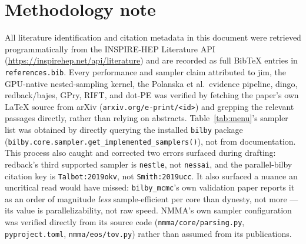 \documentclass[11pt]{article}
\newcommand{\code}[1]{\texttt{#1}}
\begin{document}
\section*{Methodology note}
All literature identification and citation metadata in this document were retrieved
programmatically from the INSPIRE-HEP Literature API
(\url{https://inspirehep.net/api/literature}) and are recorded as full BibTeX entries in
\code{references.bib}. Every performance and sampler claim attributed to jim, the GPU-native
nested-sampling kernel, the Polanska et al.\ evidence pipeline, dingo, redback/bajes, GPry,
RIFT, and dot-PE was verified by fetching the paper's own \LaTeX{} source from arXiv
(\code{arxiv.org/e-print/<id>}) and grepping the relevant passages directly, rather than
relying on abstracts. Table~\ref{tab:menu}'s sampler list was obtained by directly querying
the installed \code{bilby} package
(\code{bilby.core.sampler.get\_implemented\_samplers()}), not from documentation. This
process also caught and corrected two errors surfaced during drafting: redback's third
supported sampler is \code{nestle}, not \code{nessai}, and the parallel-bilby citation key is
\code{Talbot:2019okv}, not \code{Smith:2019ucc}. It also surfaced a nuance an uncritical read
would have missed: \code{bilby\_mcmc}'s own validation paper reports it as an order of
magnitude \emph{less} sample-efficient per core than dynesty, not more --- its value is
parallelizability, not raw speed. NMMA's own sampler configuration was verified directly from
its source code (\code{nmma/core/parsing.py}, \code{pyproject.toml}, \code{nmma/eos/tov.py})
rather than assumed from its publications.



\end{document}

